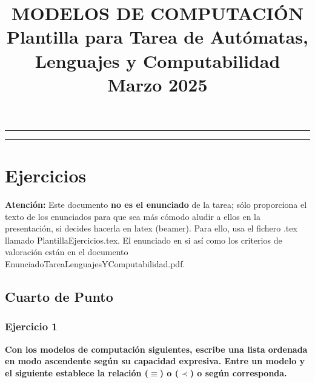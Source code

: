 \documentclass{article}
\title{MODELOS DE COMPUTACIÓN \\Plantilla para Tarea de Autómatas, Lenguajes y Computabilidad\\ Marzo 2025}
\date{}
\begin{document}
\maketitle
\hrule
% 
\hrule
\setcounter{tocdepth}{3} %
\tableofcontents

\section{Ejercicios}
\label{sec:ejercicios}
\textbf{Atención:} Este documento \textbf{no es el enunciado} de la tarea; sólo proporciona el texto de los enunciados para que sea más cómodo aludir a ellos en la presentación, si decides hacerla en latex (beamer). Para ello, usa el fichero .tex llamado PlantillaEjercicios.tex. El enunciado en si así como los criterios de valoración están en el documento EnunciadoTareaLenguajesYComputabilidad.pdf.


\subsection{Cuarto de Punto}
\label{sec:cuartopunto}
\subsubsection*{Ejercicio 1} \textbf{Con los modelos de computación  siguientes,  escribe una lista  ordenada en modo ascendente según su capacidad expresiva. Entre un modelo y el siguiente establece  la relación  ($\equiv$) o ($\prec$) o  según corresponda.} 
\end{document}
